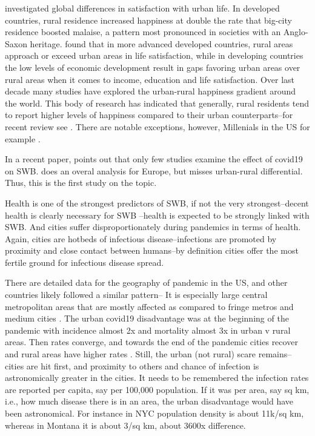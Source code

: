 \documentclass[10pt, letterpaper]{article}
\begin{document}
\begin{spacing}{1.4}
\citet{aokcities} investigated global differences in satisfaction with urban
life. In developed countries, rural residence increased happiness at double the
rate that big-city residence boosted malaise, a pattern most pronounced in
societies with an Anglo-Saxon heritage.  \citet{easterlin10al} found that in
more advanced developed countries, rural areas approach or exceed urban areas in
life satisfaction, while in developing countries the low levels of economic
development result in gaps favoring urban areas over rural areas when it comes
to income, education and life satisfaction. Over last decade many studies have 
explored the urban-rural happiness gradient around the world. This body of
research has indicated that generally, rural residents tend to report higher
levels of happiness compared to their urban counterparts--for recent review see
\citet{aok21}. There are notable exceptions, however, Millenials in the US for example \citep{aok-swbGenYcity18}.
 
In a recent paper, \citet{easterlin23} points out that only few
studies examine the effect of covid19 on SWB.  \citet{easterlin23} does an
overal analysis for Europe, but misses urban-rural differential. Thus, this is
the first study on the topic.


Health is one of the strongest predictors of SWB, if not the very
strongest--decent health is clearly necessary for SWB \citep[e.g.,][]{campbell76etal}--health is expected to be
strongly linked with SWB. And cities suffer disproportionately during pandemics
in terms of health.  
 Again, cities are hotbeds of infectious disease--infections are promoted by
proximity and close contact between humans--by definition cities offer the
most fertile ground for infectious disease spread.

There are detailed data for the geography of pandemic in the  US, and other
countries likely followed a similar pattern-- 
%
It is especially large central metropolitan areas that are mostly affected as
  compared to fringe metros and medium cities \citep{curtin2022covid}.
 The urban covid19 disadvantage was at the beginning of the pandemic with
 incidence almost 2x and mortality almost 3x in urban v rural areas. Then rates
 converge, and towards the end of the pandemic cities recover and rural areas
 have higher rates \citep{cuadros2021dynamics}. 
 Still, the urban (not rural) scare remains--cities are hit first, and proximity
 to others and chance of infection is astronomically greater in the cities. 
 It needs to be remembered the infection rates are reported per capita, say per 100,000 population. If it was per
area, say sq km, i.e., how much disease there is in an area, the urban disadvantage
would have been astronomical. For instance in NYC population density is about
11k/sq km, whereas in Montana it is about 3/sq km, about 3600x difference.




\end{spacing}
\end{document}

